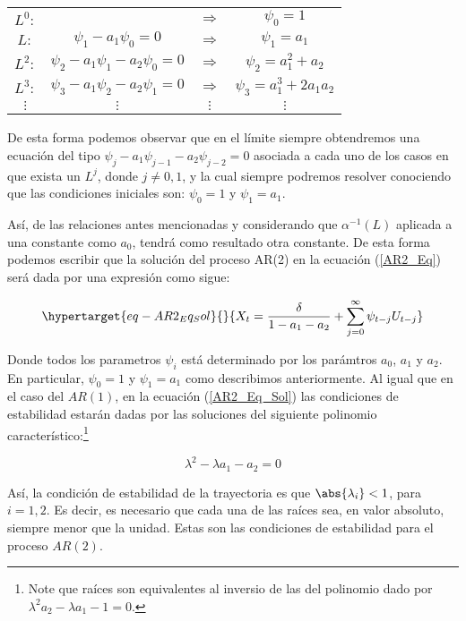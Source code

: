 \documentclass[
  a4paper,
]{article}
\begin{document}
\begin{center}
\begin{tabular}{ c c c c } 
    $L^0 :$ & $ $ & $\Rightarrow$ & $\psi_0 = 1$ \\
    $L :$ & $\psi_1 - a_1 \psi_0 = 0$ & $\Rightarrow$ & $\psi_1 = a_1$ \\
    $L^2 :$ & $\psi_2 - a_1 \psi_1 - a_2 \psi_0 = 0$ & $\Rightarrow$ & $\psi_2 = a^2_1 + a_2$ \\
    $L^3 :$ & $\psi_3 - a_1 \psi_2 - a_2 \psi_1 = 0$ & $\Rightarrow$ & $\psi_3 = a^3_1 + 2 a_1 a_2$ \\
    $\vdots$ & $\vdots$ & $\vdots$ & $\vdots$
\end{tabular}
\end{center}

De esta forma podemos observar que en el límite siempre obtendremos una
ecuación del tipo \(\psi_j - a_1 \psi_{j-1} - a_2 \psi_{j-2} = 0\)
asociada a cada uno de los casos en que exista un \(L^j\), donde
\(j \neq 0, 1\), y la cual siempre podremos resolver conociendo que las
condiciones iniciales son: \(\psi_0 = 1\) y \(\psi_1 = a_1\).

Así, de las relaciones antes mencionadas y considerando que
\(\alpha^{-1} (L)\) aplicada a una constante como \(a_0\), tendrá como
resultado otra constante. De esta forma podemos escribir que la solución
del proceso AR(2) en la ecuación (\ref{AR2_Eq}) será dada por una
expresión como sigue:

\begin{equation}\protect\hypertarget{eq-AR2_Eq_Sol}{}{
X_t = \frac{\delta}{1 - a_1 - a_2} + \sum^{\infty}_{j = 0} \psi_{t - j} U_{t - j}
}\label{eq-AR2_Eq_Sol}\end{equation}

Donde todos los parametros \(\psi_i\) está determinado por los parámtros
\(a_0\), \(a_1\) y \(a_2\). En particular, \(\psi_0 = 1\) y
\(\psi_1 = a_1\) como describimos anteriormente. Al igual que en el caso
del \(AR(1)\), en la ecuación (\ref{AR2_Eq_Sol}) las condiciones de
estabilidad estarán dadas por las soluciones del siguiente polinomio
característico:\footnote{Note que raíces son equivalentes al inversio de las del polinomio dado por $\lambda^2 a_2 - \lambda a_1 - 1 = 0$.}

\[
\lambda^2 - \lambda a_1 - a_2 = 0
\]

Así, la condición de estabilidad de la trayectoria es que
\(\abs{\lambda_i} < 1\), para \(i = 1, 2\). Es decir, es necesario que
cada una de las raíces sea, en valor absoluto, siempre menor que la
unidad. Estas son las condiciones de estabilidad para el proceso
\(AR(2)\).
\end{document}
